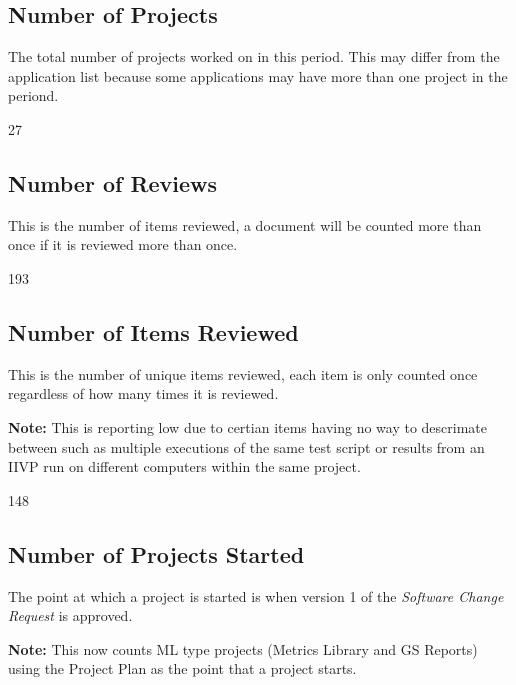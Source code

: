 \documentclass{article}
\begin{document}
\subsection{Number of Projects}
The total number of  projects worked on in this period. This may differ from the
application list because some applications may have more than one project in
the periond.

\begin{Schunk}
\begin{Soutput}
[1] 27
\end{Soutput}
\end{Schunk}

\subsection{Number of Reviews}
This is the number of items reviewed, a document will be counted more than once
if it is reviewed more than once.

\begin{Schunk}
\begin{Soutput}
[1] 193
\end{Soutput}
\end{Schunk}

\subsection{Number of Items Reviewed}
This is the number of unique items reviewed, each item is only counted once
regardless of how many times it is reviewed.

\textbf{Note:} This is reporting low due to certian items having no way to
descrimate between such as multiple executions of the same test script or
results from an IIVP run on different computers within the same project.

\begin{Schunk}
\begin{Soutput}
[1] 148
\end{Soutput}
\end{Schunk}

\subsection{Number of Projects Started}
The point at which a project is started is when version 1 of the \textit{Software
Change Request} is approved.

\textbf{Note:} This now counts ML type projects (Metrics Library and GS Reports)
using the Project Plan as the point that a project starts.
\end{document}
